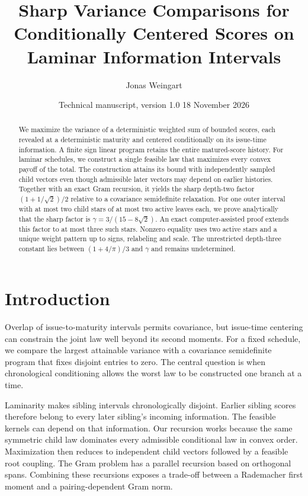 \documentclass[11pt]{article}
\title{Sharp Variance Comparisons for Conditionally Centered Scores on Laminar Information Intervals}
\author{Jonas Weingart}
\date{Technical manuscript, version 1.0 \textemdash{} 18 November 2026}
\theoremstyle{definition}
\begin{document}
\maketitle
\begin{abstract}
We maximize the variance of a deterministic weighted sum of bounded scores,
each revealed at a deterministic maturity and centered conditionally on its
issue-time information. A finite sign linear program retains the entire
matured-score history. For laminar schedules, we construct a single feasible
law that maximizes every convex payoff of the total. The construction
attains its bound with independently sampled child vectors even though
admissible later vectors may depend on earlier histories. Together with an
exact Gram recursion, it yields the sharp depth-two factor
$(1+1/\sqrt2)/2$ relative to a covariance semidefinite relaxation.
For one outer interval with at most two child stars of at most two active
leaves each, we prove analytically that the sharp factor is
$\gamma=3/(15-8\sqrt2)$. An exact computer-assisted proof extends this
factor to at most three such stars. Nonzero equality uses two active
stars and a unique weight pattern up to signs, relabeling and scale.
The unrestricted depth-three constant lies between $(1+4/\pi)/3$ and
$\gamma$ and remains undetermined.
\end{abstract}

\section{Introduction}

Overlap of issue-to-maturity intervals permits covariance, but issue-time
centering can constrain the joint law well beyond its second moments.
For a fixed schedule, we compare the largest attainable variance with
a covariance semidefinite program that fixes disjoint entries to zero.
The central question is when chronological conditioning allows the
worst law to be constructed one branch at a time.

Laminarity makes sibling intervals chronologically disjoint. Earlier
sibling scores therefore belong to every later sibling's incoming
information. The feasible kernels can depend on that information.
Our recursion works because the same symmetric child law dominates
every admissible conditional law in convex order. Maximization then
reduces to independent child vectors followed by a feasible root coupling.
The Gram problem has a parallel recursion based on orthogonal spans.
Combining these recursions exposes a trade-off between a Rademacher first
moment and a pairing-dependent Gram norm.
\end{document}
